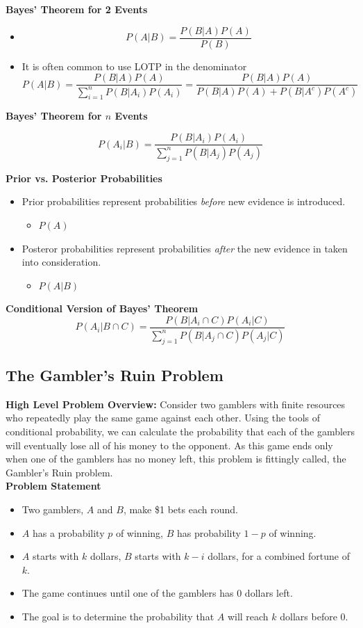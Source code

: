 \documentclass[11pt]{article}
\begin{document}
\textbf{Bayes' Theorem for 2 Events}
\begin{itemize}
    \item \[P(A|B) = \frac{P(B|A)P(A)}{P(B)}\]
    \item It is often common to use LOTP in the denominator
    \[P(A|B) = \frac{P(B|A)P(A)}{\sum_{i=1}^{n}P(B|A_i)P(A_i)} = 
    \frac{P(B|A)P(A)}{P(B|A)P(A) + P(B|A^c)P(A^c)} \]
\end{itemize}



\textbf{Bayes' Theorem for $n$ Events}

\[P(A_i|B)=\frac{P(B|A_i)P(A_i)}{\sum_{j=1}^{n}P(B|A_j)P(A_j)}\]

\textbf{Prior vs. Posterior Probabilities}
\begin{itemize}
    \item Prior probabilities represent probabilities \textit{before} new evidence is 
    introduced.
    \begin{itemize}
        \item $P(A)$
    \end{itemize}
    \item Posteror probabilities represent probabilities \textit{after} the new evidence in 
    taken into consideration.
    \begin{itemize}
        \item $P(A|B)$
    \end{itemize}
\end{itemize}

\textbf{Conditional Version of Bayes' Theorem}
\[P(A_i|B \cap C) = \frac{P(B|A_i \cap C)P(A_i|C)}{\sum_{j=1}^{n}P(B|A_j \cap C)P(A_j|C)}\]

\subsection{The Gambler's Ruin Problem}

\textbf{High Level Problem Overview:} Consider two gamblers with finite resources who 
repeatedly play the same game against each other. Using the tools of conditional probability, 
we can calculate the probability that each of the gamblers will eventually lose all of his 
money to the opponent. As this game ends only when one of the gamblers has no money left, this
problem is fittingly called, the Gambler's Ruin problem. \\

\textbf{Problem Statement}
\begin{itemize}
    \item Two gamblers, $A$ and $B$, make \$1 bets each round.
    \item $A$ has a probability $p$ of winning, $B$ has probability $1-p$ of winning.
    \item $A$ starts with $k$ dollars, $B$ starts with $k-i$ dollars, for a combined fortune of
    $k$.
    \item The game continues until one of the gamblers has 0 dollars left.
    \item The goal is to determine the probability that $A$ will reach $k$ dollars before 0.
\end{itemize}
\end{document}
